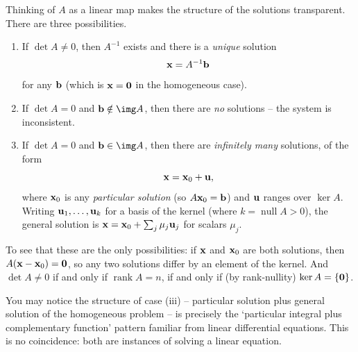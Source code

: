 \documentclass[a4paper]{scrartcl}
\newcommand{\rank}{\operatorname{rank}}
\newcommand{\nullity}{\operatorname{null}}
\begin{document}
Thinking of $A$ as a linear map makes the structure of the solutions transparent. There are three possibilities.
\begin{enumerate}[label=(\roman*)]
	\item If $\det A \neq 0$, then $A^{-1}$ exists and there is a \emph{unique} solution
	$$
	\mathbf{x} = A^{-1}\mathbf{b}
	$$
	for any $\mathbf{b}$ (which is $\mathbf{x} = \mathbf{0}$ in the homogeneous case).
	\item If $\det A = 0$ and $\vv{b} \notin \img A$, then there are \emph{no} solutions -- the system is inconsistent.
	\item If $\det A = 0$ and $\vv{b} \in \img A$, then there are \emph{infinitely many} solutions, of the form
	$$
	\mathbf{x} = \mathbf{x}_0 + \mathbf{u},
	$$
	where $\mathbf{x}_0$ is any \emph{particular solution} (so $A \mathbf{x}_0 = \mathbf{b}$) and $\mathbf{u}$ ranges over $\ker A$. Writing $\mathbf{u}_1, \dots, \mathbf{u}_k$ for a basis of the kernel (where $k = \nullity A > 0$), the general solution is $\mathbf{x} = \mathbf{x}_0 + \sum_{j} \mu_j \mathbf{u}_j$ for scalars $\mu_j$.
\end{enumerate}
To see that these are the only possibilities: if $\mathbf{x}$ and $\mathbf{x}_0$ are both solutions, then $A(\mathbf{x} - \mathbf{x}_0) = \mathbf{0}$, so any two solutions differ by an element of the kernel. And $\det A \neq 0$ if and only if $\rank A = n$, if and only if (by rank-nullity) $\ker A = \{\mathbf{0}\}$.

You may notice the structure of case (iii) -- particular solution plus general solution of the homogeneous problem -- is precisely the `particular integral plus complementary function' pattern familiar from linear differential equations. This is no coincidence: both are instances of solving a linear equation.
\end{document}
